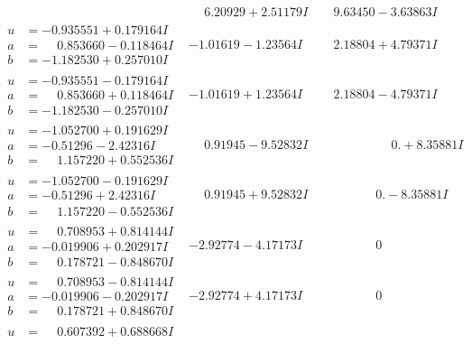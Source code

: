 \documentclass[1p]{elsarticle_modified}
\theoremstyle{definition}
\begin{document}
$$\begin{array}{c|c|c}
 & \phantom{-}6.20929 + 2.51179 I & \phantom{-}9.63450 - 3.63863 I \\ \hline\begin{aligned}
u &= -0.935551 + 0.179164 I \\
a &= \phantom{-}0.853660 - 0.118464 I \\
b &= -1.182530 + 0.257010 I\end{aligned}
 & -1.01619 - 1.23564 I & \phantom{-}2.18804 + 4.79371 I \\ \hline\begin{aligned}
u &= -0.935551 - 0.179164 I \\
a &= \phantom{-}0.853660 + 0.118464 I \\
b &= -1.182530 - 0.257010 I\end{aligned}
 & -1.01619 + 1.23564 I & \phantom{-}2.18804 - 4.79371 I \\ \hline\begin{aligned}
u &= -1.052700 + 0.191629 I \\
a &= -0.51296 - 2.42316 I \\
b &= \phantom{-}1.157220 + 0.552536 I\end{aligned}
 & \phantom{-}0.91945 - 9.52832 I & \phantom{-0.000000 -}0. + 8.35881 I \\ \hline\begin{aligned}
u &= -1.052700 - 0.191629 I \\
a &= -0.51296 + 2.42316 I \\
b &= \phantom{-}1.157220 - 0.552536 I\end{aligned}
 & \phantom{-}0.91945 + 9.52832 I & \phantom{-0.000000 } 0. - 8.35881 I \\ \hline\begin{aligned}
u &= \phantom{-}0.708953 + 0.814144 I \\
a &= -0.019906 + 0.202917 I \\
b &= \phantom{-}0.178721 - 0.848670 I\end{aligned}
 & -2.92774 - 4.17173 I & \phantom{-0.000000 } 0 \\ \hline\begin{aligned}
u &= \phantom{-}0.708953 - 0.814144 I \\
a &= -0.019906 - 0.202917 I \\
b &= \phantom{-}0.178721 + 0.848670 I\end{aligned}
 & -2.92774 + 4.17173 I & \phantom{-0.000000 } 0 \\ \hline\begin{aligned}
u &= \phantom{-}0.607392 + 0.688668 I \\

\end{aligned}
\end{array}$$
\end{document}
